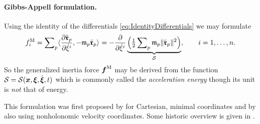 \paragraph{Gibbs-Appell formulation.}
Using the identity of the differentials \eqref{eq:IdentityDifferentials} we may formulate
\begin{align}
 \genForceInertiaCoeff{\LidxI}
 = \sumParticles \sProd{\pdiff[\particlePosdd{\PidxI}]{\sysVelCoeffd{\LidxI}}}{-\particleMass{\PidxI} \particlePosdd{\PidxI}}
 = -\pdiff{\sysVelCoeffd{\LidxI}} \underbrace{\Big(\tfrac{1}{2} \sumParticles \particleMass{\PidxI} \norm{\particlePosdd{\PidxI}}^2\Big)}_{\accEnergy},
 \qquad
 \LidxI = 1,\ldots,\dimConfigSpace.
\label{eq:InertiaForceAccEnergy}
\end{align}
So the generalized inertia force $\boldsymbol{f}^{\mathrm{M}}$ may be derived from the function $\mathcal{S} = \mathcal{S}(\boldsymbol{x}, \boldsymbol{\xi}, \dot{\boldsymbol{\xi}}, t)$ which is commonly called the \textit{acceleration energy} though its unit is \textit{not} that of energy.

This formulation was first proposed by \cite{Gibbs:FundamentalFormulaeOfDynamics} for Cartesian, minimal coordinates and by \cite{Appell:formeGenerale} also using nonholonomic velocity coordinates.
Some historic overview is given in \cite[sec. 1]{Lewis:GaussPrinciple}.

